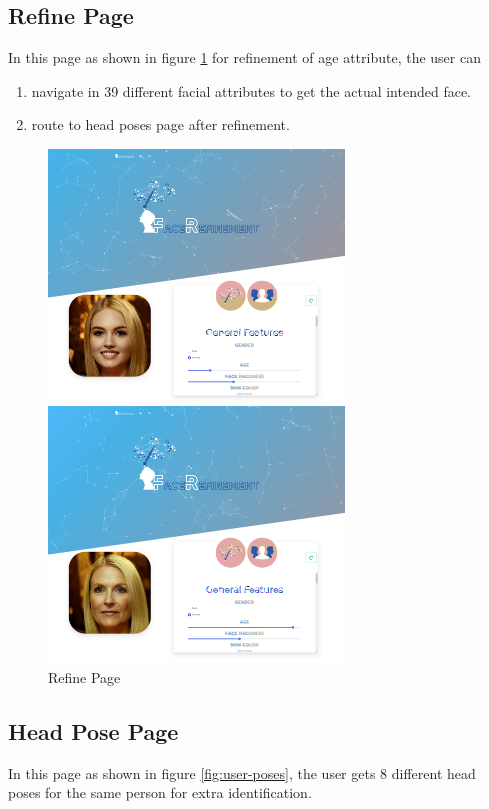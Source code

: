 \subsection{Refine Page}
In this page as shown in figure \ref{fig:user-refine} for refinement of age attribute, the user can 

\begin{enumerate}
    \item navigate in 39 different facial attributes to get the actual intended face.
    \item route to head poses page after refinement.
\end{enumerate}

\begin{figure}[H]
    \centering
    \includegraphics[width=0.7\textwidth]{images/website/refine.png}
    \caption{Refine Page}
    \label{fig:user-refine}
\end{figure}


\subsection{Head Pose Page}
In this page as shown in figure \ref{fig:user-poses}, the user gets 8 different head poses for the same person for extra identification. 


